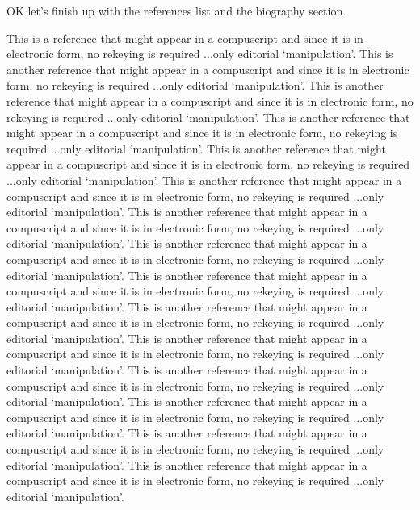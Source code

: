 OK let's finish up with the references list and the biography section.




\begin{yourbibliography}{99}
\bibitem{}This is a reference that might appear in a compuscript and
since it is in electronic form, no rekeying is required ...only
editorial `manipulation'. 
\bibitem{}This is another reference that might appear in a compuscript
and since it is in electronic form, no rekeying is required ...only
editorial `manipulation'.
\bibitem{}This is another reference that might appear in a compuscript
and since it is in electronic form, no rekeying is required ...only
editorial `manipulation'.
\bibitem{}This is another reference that might appear in a compuscript
and since it is in electronic form, no rekeying is required ...only
editorial `manipulation'.
\bibitem{}This is another reference that might appear in a compuscript
and since it is in electronic form, no rekeying is required ...only
editorial `manipulation'.
\bibitem{}This is another reference that might appear in a compuscript
and since it is in electronic form, no rekeying is required ...only
editorial `manipulation'.
\bibitem{}This is another reference that might appear in a compuscript
and since it is in electronic form, no rekeying is required ...only
editorial `manipulation'.
\bibitem{}This is another reference that might appear in a compuscript
and since it is in electronic form, no rekeying is required ...only
editorial `manipulation'.
\bibitem{}This is another reference that might appear in a compuscript
and since it is in electronic form, no rekeying is required ...only
editorial `manipulation'.
\bibitem{}This is another reference that might appear in a compuscript
and since it is in electronic form, no rekeying is required ...only
editorial `manipulation'.
\bibitem{}This is another reference that might appear in a compuscript
and since it is in electronic form, no rekeying is required ...only
editorial `manipulation'.
\bibitem{}This is another reference that might appear in a compuscript
and since it is in electronic form, no rekeying is required ...only
editorial `manipulation'.
\bibitem{}This is another reference that might appear in a compuscript
and since it is in electronic form, no rekeying is required ...only
editorial `manipulation'.
\bibitem{}This is another reference that might appear in a compuscript
and since it is in electronic form, no rekeying is required ...only
editorial `manipulation'.
\bibitem{}This is another reference that might appear in a compuscript
and since it is in electronic form, no rekeying is required ...only
editorial `manipulation'.

\end{yourbibliography}





